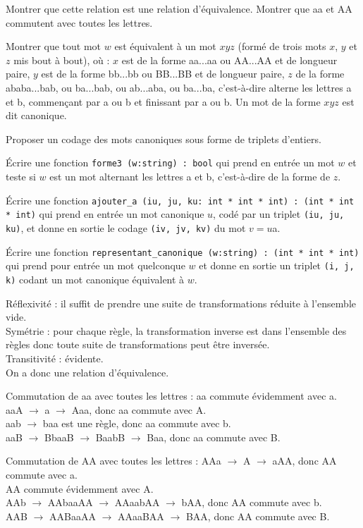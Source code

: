 \Q
Montrer que cette relation est une relation d'équivalence. Montrer que aa et AA commutent avec toutes les lettres.

\Q
Montrer que tout mot $w$ est équivalent à un mot $xyz$ (formé de trois mots $x$, $y$ et $z$ mis bout à bout), où : $x$ est de la forme aa...aa ou AA...AA et de longueur paire, $y$ est de la forme bb...bb ou BB...BB et de longueur paire, $z$ de la forme ababa...bab, ou ba...bab, ou ab...aba, ou ba...ba, c'est-à-dire alterne les lettres a et b, commençant par a ou b et finissant par a ou b. Un mot de la forme $xyz$ est dit canonique.

\Q
Proposer un codage des mots canoniques sous forme de triplets d'entiers.

\Q
Écrire une fonction \texttt{forme3 (w:string) : bool} qui prend en entrée un mot $w$ et teste si $w$ est un mot alternant les lettres a et b, c'est-à-dire de la forme de $z$.

\Q
Écrire une fonction \texttt{ajouter\_a (iu, ju, ku: int * int * int) : (int * int * int)} qui prend en entrée un mot canonique $u$, codé par un triplet \texttt{(iu, ju, ku)}, et donne en sortie le codage \texttt{(iv, jv, kv)} du mot $v=u$a.

\Q
Écrire une fonction \texttt{representant\_canonique (w:string) : (int * int * int)} \newline qui prend pour entrée un mot quelconque $w$ et donne en sortie un triplet \texttt{(i, j, k)} codant un mot canonique équivalent à $w$.

\Corrige

\Q
Réflexivité : il suffit de prendre une suite de transformations réduite à l'ensemble vide.\\
Symétrie : pour chaque règle, la transformation inverse est dans l'ensemble des règles donc toute suite de transformations peut être inversée.\\
Transitivité : évidente.\\
On a donc une relation d'équivalence.
\bigskip

Commutation de aa avec toutes les lettres : aa commute évidemment avec a.\\
aaA $\rightarrow$ a $\rightarrow$ Aaa, donc aa commute avec A.\\
aab $\rightarrow$ baa est une règle, donc aa commute avec b.\\
aaB $\rightarrow$ BbaaB $\rightarrow$ BaabB $\rightarrow$ Baa, donc aa commute avec B.
\bigskip

Commutation de AA avec toutes les lettres : AAa $\rightarrow$ A $\rightarrow$ aAA, donc AA commute avec a.\\
AA commute évidemment avec A.\\
AAb $\rightarrow$ AAbaaAA $\rightarrow$ AAaabAA $\rightarrow$ bAA, donc AA commute avec b.\\
AAB $\rightarrow$ AABaaAA $\rightarrow$ AAaaBAA $\rightarrow$ BAA, donc AA commute avec B.
\medskip

